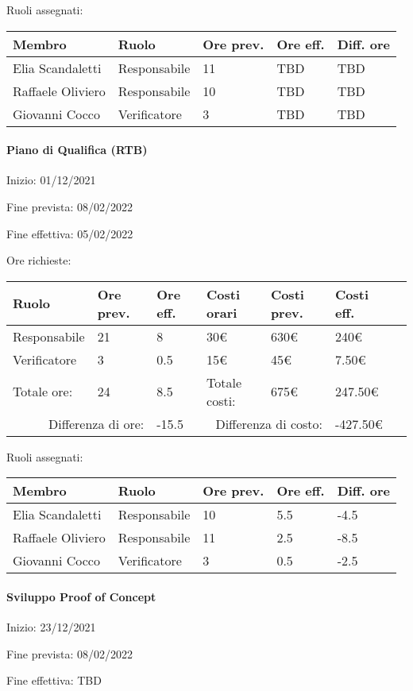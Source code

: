 \documentclass[a4paper, 12pt]{article}
\begin{document}
Ruoli assegnati:\\[0.5em]
\begin{tabular}{|l|l|l|l|l|}\hline
Membro & Ruolo & Ore prev. & Ore eff. & Diff. ore \\\hline
Elia Scandaletti & Responsabile & 11 & TBD & TBD \\\hline
Raffaele Oliviero & Responsabile & 10 & TBD & TBD \\\hline
Giovanni Cocco & Verificatore & 3 & TBD & TBD \\\hline
\end{tabular}

\paragraph{Piano di Qualifica (RTB)}
Inizio: 01/12/2021\par
Fine prevista: 08/02/2022\par
Fine effettiva: 05/02/2022

Ore richieste:\\[0.5em]
\begin{tabular}{|l|l|l||l|l|l|l|}\hline
Ruolo & Ore prev. & Ore eff. & Costi orari & Costi prev. & Costi eff.\\\hline
Responsabile & 21 & 8 & 30\euro & 630\euro & 240\euro \\\hline
Verificatore & 3 & 0.5 & 15\euro & 45\euro & 7.50\euro \\\hline
Totale ore: & 24 & 8.5 & Totale costi: & 675\euro & 247.50\euro \\\hline
\multicolumn{2}{|r|}{Differenza di ore:} & -15.5 & \multicolumn{2}{r|}{Differenza di costo:} & -427.50\euro \\\hline
\end{tabular}

Ruoli assegnati:\\[0.5em]
\begin{tabular}{|l|l|l|l|l|}\hline
Membro & Ruolo & Ore prev. & Ore eff. & Diff. ore \\\hline
Elia Scandaletti & Responsabile & 10 & 5.5 & -4.5 \\\hline
Raffaele Oliviero & Responsabile & 11 & 2.5 & -8.5 \\\hline
Giovanni Cocco & Verificatore & 3 & 0.5 & -2.5 \\\hline
\end{tabular}

\paragraph{Sviluppo Proof of Concept}
Inizio: 23/12/2021\par
Fine prevista: 08/02/2022\par
Fine effettiva: TBD
\end{document}

